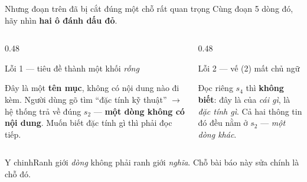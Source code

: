 \documentclass[aspectratio=169,10pt]{beamer}
\newcommand{\keyidea}[1]{%
  \begin{center}\begin{block}{\small Y chinh}\centering #1\end{block}\end{center}}
\begin{document}
\begin{frame}{Nhưng đoạn trên đã bị cắt đúng một chỗ rất quan trọng}
  {\footnotesize Cùng đoạn 5 dòng đó, hãy nhìn \textbf{hai ô đánh dấu đỏ}.}
  \begin{columns}[T]
    \begin{column}{0.48\textwidth}
      \begin{alertblock}{\small Lỗi 1 --- tiêu đề thành một khối \emph{rỗng}}
        \footnotesize
        \begin{center}
        \end{center}
        Đây là một \textbf{tên mục}, không có nội dung nào đi kèm.
        Người dùng gõ tìm ``đặc tính kỹ thuật'' $\rightarrow$ hệ thống trả về đúng $s_2$
        --- \textbf{một dòng không có nội dung}. Muốn biết đặc tính gì thì phải đọc tiếp.
      \end{alertblock}
    \end{column}
    \begin{column}{0.48\textwidth}
      \begin{alertblock}{\small Lỗi 2 --- vế (2) mất chủ ngữ}
        \footnotesize
        \begin{center}
        \end{center}
        Đọc riêng $s_4$ thì \textbf{không biết}: đây là của \emph{cái gì}, là \emph{đặc tính gì}.
        Cả hai thông tin đó đều nằm ở $s_2$ --- \emph{một dòng khác}.
      \end{alertblock}
    \end{column}
  \end{columns}
  \keyidea{Ranh giới \emph{dòng} không phải ranh giới \emph{nghĩa}. Chỗ bài báo này sửa
  chính là chỗ đó.}
\end{frame}
\end{document}
